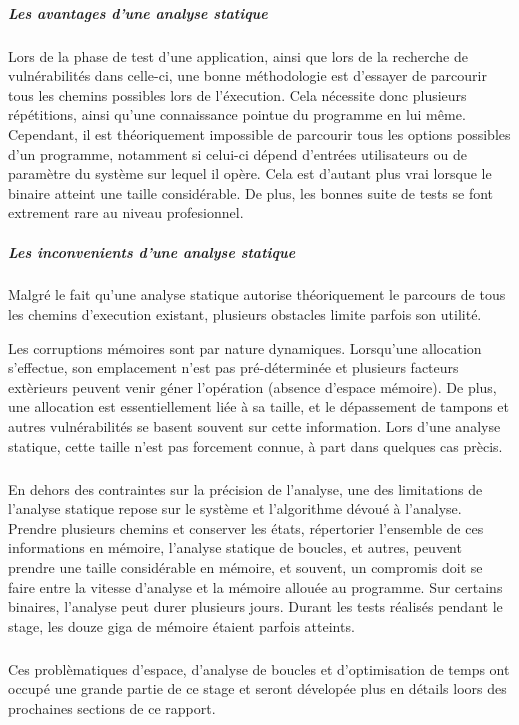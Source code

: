\subparagraph{Les avantages d'une analyse statique}

Lors de la phase de test d'une application, ainsi que lors de la recherche de vulnérabilités dans celle-ci, une bonne méthodologie
est d'essayer de parcourir tous les chemins possibles lors de l'éxecution. Cela nécessite donc plusieurs répétitions, ainsi qu'une connaissance
pointue du programme en lui même.\newline
Cependant, il est théoriquement impossible de parcourir tous les options possibles d'un programme, notamment si
celui-ci dépend d'entrées utilisateurs ou de paramètre du système sur lequel il opère. Cela est d'autant plus vrai lorsque le binaire atteint une taille
considérable. De plus, les bonnes suite de tests se font extrement rare au niveau profesionnel.

\subparagraph{Les inconvenients d'une analyse statique}

Malgré le fait qu'une analyse statique autorise théoriquement le parcours de tous les chemins d'execution existant, plusieurs obstacles
limite parfois son utilité.\newline

Les corruptions mémoires sont par nature dynamiques. Lorsqu'une allocation s'effectue, son emplacement n'est pas pré-déterminée
et plusieurs facteurs extèrieurs peuvent venir géner l'opération (absence d'espace mémoire). De plus, une allocation
est essentiellement liée à sa taille, et le dépassement de tampons et autres vulnérabilités se basent souvent sur cette information.
Lors d'une analyse statique, cette taille n'est pas forcement connue, à part dans quelques cas prècis.
\subparagraph{}

En dehors des contraintes sur la précision de l'analyse, une des limitations de l'analyse statique repose sur le système et l'algorithme
dévoué à l'analyse. Prendre plusieurs chemins et conserver les états, répertorier l'ensemble de ces informations en mémoire, l'analyse
statique de boucles, et autres, peuvent prendre une taille considérable en mémoire, et souvent, un compromis doit se faire entre la vitesse
d'analyse et la mémoire allouée au programme. Sur certains binaires, l'analyse peut durer plusieurs jours. Durant les tests réalisés pendant le
stage, les douze giga de mémoire étaient parfois atteints.
\subparagraph{}
Ces problèmatiques d'espace, d'analyse de boucles et d'optimisation de temps ont occupé une grande partie de ce stage et seront dévelopée plus
en détails loors des prochaines sections de ce rapport.

